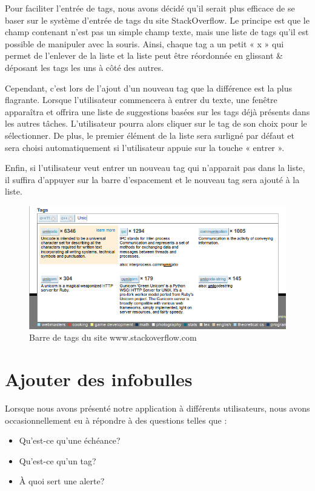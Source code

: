 \documentclass[letterpaper, oneside, 12pt, these, creativecommons]{thETS}
\begin{document}
Pour faciliter l'entrée de tags, nous avons décidé qu'il serait plus efficace de se baser sur le système d'entrée de tags du site StackOverflow. Le principe est que le champ contenant n'est pas un simple champ texte, mais une liste de tags qu'il est possible de manipuler avec la souris. Ainsi, chaque tag a un petit « x » qui permet de l'enlever de la liste et la liste peut être réordonnée en glissant \& déposant les tags les uns à côté des autres.

Cependant, c'est lors de l'ajout d'un nouveau tag que la différence est la plus flagrante. Lorsque l'utilisateur commencera à entrer du texte, une fenêtre apparaîtra et offrira une liste de suggestions basées sur les tags déjà présents dans les autres tâches. L'utilisateur pourra alors cliquer sur le tag de son choix pour le sélectionner. De plus, le premier élément de la liste sera surligné par défaut et sera choisi automatiquement si l'utilisateur appuie sur la touche « entrer ».

Enfin, si l'utilisateur veut entrer un nouveau tag qui n'apparait pas dans la liste, il suffira d'appuyer sur la barre d'espacement et le nouveau tag sera ajouté à la liste.

\begin{figure}
    \includegraphics[scale=0.5]{tags_stackoverflow.png}
    \caption{Barre de tags du site www.stackoverflow.com}
\end{figure}

\section{Ajouter des infobulles}

Lorsque nous avons présenté notre application à différents utilisateurs, nous avons occasionnellement eu à répondre à des questions telles que :

\begin{itemize}
    \item Qu'est-ce qu'une échéance?
    \item Qu'est-ce qu'un tag?
    \item À quoi sert une alerte?
\end{itemize}
\end{document}
